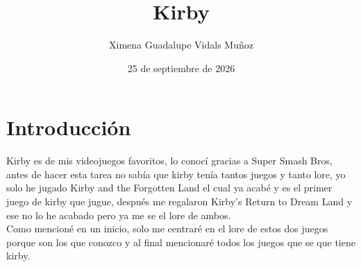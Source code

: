 \documentclass{article}
\title{Kirby}
\author{Ximena Guadalupe Vidals Muñoz}
\date{25 de septiembre de 2026}
\begin{document}
\maketitle

\section{Introducción}
Kirby es de mis videojuegos favoritos, lo conocí gracias a Super Smash Bros, antes de hacer esta tarea no sabía que kirby tenía tantos juegos y tanto lore, yo solo he jugado Kirby and the Forgotten Land el cual ya acabé y es el primer juego de kirby que jugue, después me regalaron Kirby's Return to Dream Land y ese no lo he acabado pero ya me se el lore de ambos. \\
Como mencioné en un inicio, solo me centraré en el lore de estos dos juegos porque son los que conozco y al final mencionaré todos los juegos que se que tiene kirby. 
\end{document}
